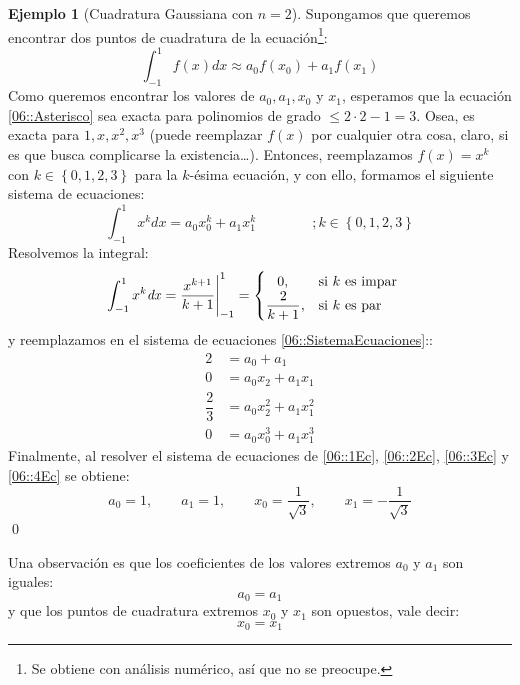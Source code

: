 \documentclass[english, spanish, fleqn, 10pt]{article}
\numberwithin{equation}{section}
\newcommand{\nparentesis}[1]{\left( #1 \right)}
\newcommand{\llaves}[1]{\left \{ #1 \right \}}
\theoremstyle{definition}
\newtheorem{beforeExample}{Ejemplo}[section]
\newenvironment{ejemplo}[1][]{\begin{beforeExample}[#1]\renewcommand{\qedsymbol}{$\blacksquare$}}{\qed\end{beforeExample}}
\begin{document}
\begin{ejemplo}[Cuadratura Gaussiana con $n=2$]\label{06::CuadGauss:n2}
	Supongamos que queremos encontrar dos puntos de cuadratura de la ecuación\footnote{Se obtiene con análisis numérico, así que no se preocupe.}:
	\begin{equation}\label{06::Asterisco}
	\int_{-1}^1f\nparentesis{x}\mathit{dx}\approx a_0f\nparentesis{x_0}+a_1f\nparentesis{x_1}
	\end{equation}
	Como queremos encontrar los valores de $a_0, a_1, x_0$ y $x_1$, esperamos que la ecuación \eqref{06::Asterisco} sea exacta para polinomios de grado $\leq 2\cdot 2-1=3$. Osea, es exacta para $1, x, x^2, x^3$ (puede reemplazar $f\nparentesis{x}$ por cualquier otra cosa, claro, si es que busca complicarse la existencia\ldots). Entonces, reemplazamos $f\nparentesis{x}=x^k$ con $k\in\llaves{0, 1, 2, 3}$ para la $k$-ésima ecuación, y con ello, formamos el siguiente sistema de ecuaciones:
	\begin{equation}\label{06::SistemaEcuaciones}
	\int_{-1}^{1}x^k\mathit{dx}=a_0x_0^k+a_1x_1^k\qquad\qquad;k\in\llaves{0, 1, 2, 3}
	\end{equation}
	Resolvemos la integral:
	\begin{align*}
	\int_{-1}^1x^k \mathit{dx}&=\dfrac{x^{k+1}}{k+1}\Bigg |_{-1}^1
	=\begin{cases}
	\hspace{2.9mm}0, &\text{si }k\text{ es impar}\\
	\dfrac{2}{k+1}, &\text{si }k\text{ es par}
	\end{cases}
	\end{align*}
	y reemplazamos en el sistema de ecuaciones \eqref{06::SistemaEcuaciones}::
	\begin{align}
	2&= a_0+a_1\label{06::1Ec}\\
	0&= a_0x_2+a_1x_1\label{06::2Ec}\\
	\dfrac{2}{3}&= a_0x_2^2+a_1x_1^2\label{06::3Ec}\\
	0&= a_0x_0^3+a_1x_1^3\label{06::4Ec}
	\end{align}
	Finalmente, al resolver el sistema de ecuaciones de \eqref{06::1Ec}, \eqref{06::2Ec}, \eqref{06::3Ec} y \eqref{06::4Ec} se obtiene:
	\begin{equation*}
	a_0=1,\qquad a_1=1,\qquad x_0=\dfrac{1}{\sqrt{3}},\qquad x_1=-\dfrac{1}{\sqrt{3}}
	\end{equation*}
\end{ejemplo}
Una observación es que los coeficientes de los valores extremos $a_0$ y $a_1$ son iguales:
\begin{equation*}
a_0=a_1
\end{equation*}
y que los puntos de cuadratura extremos $x_0$ y $x_1$ son opuestos, vale decir:
\begin{equation*}
x_0=x_1
\end{equation*}
\end{document}
